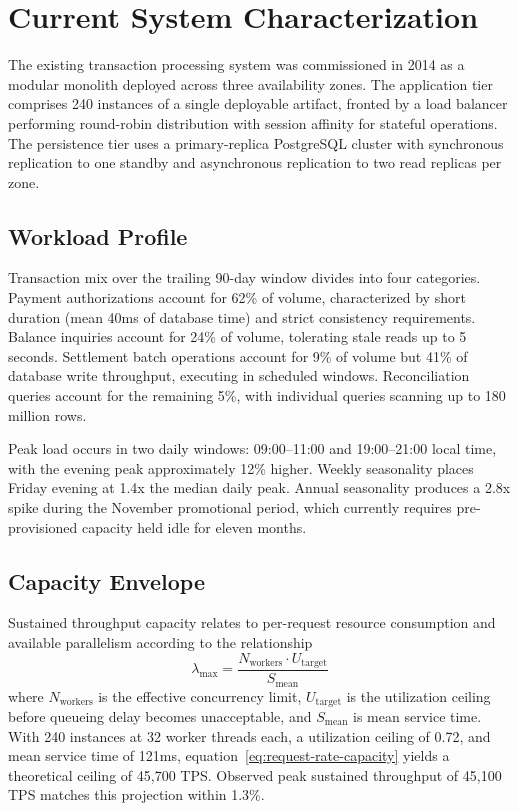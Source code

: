 \section{Current System Characterization}

The existing transaction processing system was commissioned in 2014 as a modular monolith deployed across three availability zones. The application tier comprises 240 instances of a single deployable artifact, fronted by a load balancer performing round-robin distribution with session affinity for stateful operations. The persistence tier uses a primary-replica PostgreSQL cluster with synchronous replication to one standby and asynchronous replication to two read replicas per zone.

\subsection{Workload Profile}

Transaction mix over the trailing 90-day window divides into four categories. Payment authorizations account for 62\% of volume, characterized by short duration (mean 40ms of database time) and strict consistency requirements. Balance inquiries account for 24\% of volume, tolerating stale reads up to 5 seconds. Settlement batch operations account for 9\% of volume but 41\% of database write throughput, executing in scheduled windows. Reconciliation queries account for the remaining 5\%, with individual queries scanning up to 180 million rows.

Peak load occurs in two daily windows: 09:00--11:00 and 19:00--21:00 local time, with the evening peak approximately 12\% higher. Weekly seasonality places Friday evening at 1.4x the median daily peak. Annual seasonality produces a 2.8x spike during the November promotional period, which currently requires pre-provisioned capacity held idle for eleven months.

\subsection{Capacity Envelope}

Sustained throughput capacity relates to per-request resource consumption and available parallelism according to the relationship
\begin{equation}
\label{eq:request-rate-capacity}
\lambda_{\max} = \frac{N_{\text{workers}} \cdot U_{\text{target}}}{S_{\text{mean}}}
\end{equation}
where $N_{\text{workers}}$ is the effective concurrency limit, $U_{\text{target}}$ is the utilization ceiling before queueing delay becomes unacceptable, and $S_{\text{mean}}$ is mean service time. With 240 instances at 32 worker threads each, a utilization ceiling of 0.72, and mean service time of 121ms, equation~\eqref{eq:request-rate-capacity} yields a theoretical ceiling of 45,700 TPS. Observed peak sustained throughput of 45,100 TPS matches this projection within 1.3\%.

